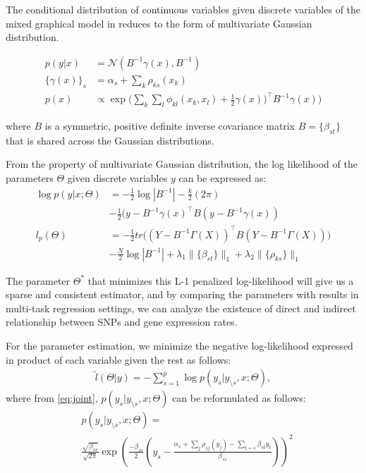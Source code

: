 \documentclass{article}
\begin{document}
The conditional distribution of continuous variables given discrete variables of the mixed graphical model in \cite{lee2013structure} reduces to the form of multivariate Gaussian distribution.

\begin{align}
p(y|x) &= \mathcal{N}(B^{-1}\gamma(x), B^{-1}) \label{eq:cond_prob}\\
\{\gamma(x)\}_s &= \alpha_s + \sum_{k} \rho_{ks}(x_k) \\
p(x) &\propto \exp \Big( \sum_{k} \sum_{l} \phi_{kl}(x_k, x_l) + \frac{1}{2} \gamma(x))^\intercal B^{-1} \gamma(x) \Big)
\end{align}

where $B$ is a symmetric, positive definite inverse covariance matrix $B = \{ \beta_{st}\}$ that is shared across the Gaussian distributions. 

From the property of multivariate Gaussian distribution, the log likelihood of the parameters $\Theta$ given discrete variables $y$ can be expressed as:
\begin{align}
\log p(y | x; \Theta) &= -\frac{1}{2}\log |B^{-1}| -\frac{k}{2} (2 \pi) \nonumber    \\
& -\frac{1}{2} (y - B^{-1} \gamma(x)^\intercal B (y - B^{-1} \gamma(x)) \label{eq:loglikli} \\ 
l_p(\Theta) &= -\frac{1}{2} tr\Big((Y - B^{-1} \Gamma(X))^\intercal B (Y - B^{-1} \Gamma(X)) \Big) \nonumber \\
& -\frac{N}{2} \log|B^{-1}| + \lambda_1 \|\{\beta_{st}\}\|_1 + \lambda_2 \|\{\rho_{ks}\}\|_1 \label{eq:obj}
\end{align}

The parameter $\Theta^*$ that minimizes this L-1 penalized log-likelihood will give us a sparse and consistent estimator, and by comparing the parameters with results in multi-task regression settings, we can analyze the existence of direct and indirect relationship between SNPs and gene expression rates.

For the parameter estimation, we minimize the negative log-likelihood expressed in product of each variable given the rest as follows:
\begin{align}
\tilde{l}(\Theta |y) = - \sum_{s=1}^{p} \log p(y_s |y_{\setminus s}, x;\Theta),
\end{align}
where from \ref{eq:joint}, $p(y_s |y_{\setminus s}, x;\Theta)$ can be reformulated as follows:
\begin{align}
&p(y_s |y_{\setminus s}, x;\Theta) =\nonumber    \\
& \frac{\sqrt{\beta_{ss}}}{\sqrt{2\pi}} \exp \left(\frac{-\beta_{ss}}{2} \left(y_s - \frac{\alpha_s + \sum_j \rho_{sj}(y_j)-\sum_{t=s}\beta_{st}y_t }{\beta_{ss}}\right) \right)^2
\end{align}
\end{document}

